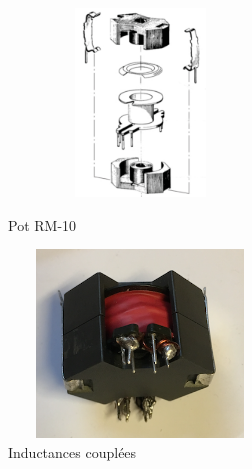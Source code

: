 \documentclass[12pt]{article}
\begin{document}
\begin{figure}[!h]
  \hspace{-30pt}
  \vspace{-30pt}
  \begin{minipage}[b]{0.45\linewidth}
   \centering
   \includegraphics[width=7cm,height=5cm,trim=0cm 0cm 0cm 0cm, clip=true]{Images_rapport/pot}  
   \caption{Pot RM-10}   
  \end{minipage}
\hfill
  \begin{minipage}[b]{0.45\linewidth}
   \centering
   \includegraphics[width=7cm,height=5cm,trim=0cm 0cm 0cm 0cm, clip=true]{Images_rapport/transfo}  
   \caption{Inductances couplées}   
  \end{minipage}
\end{figure}

\vspace{15pt}
\end{document}
